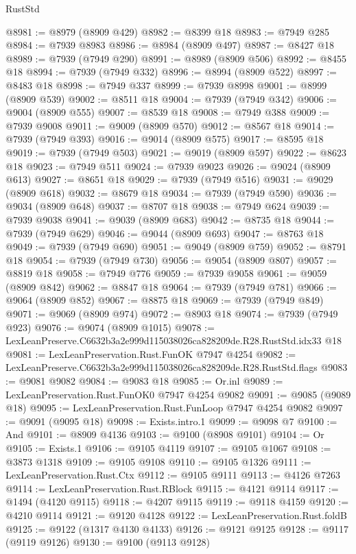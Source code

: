 \begin{lexlean}{RustStd}
\begin{coremodule}
@8981 := @8979 (@8909 @429)
@8982 := @8399 @18
@8983 := @7949 @285
@8984 := @7939 @8983
@8986 := @8984 (@8909 @497)
@8987 := @8427 @18
@8989 := @7939 (@7949 @290)
@8991 := @8989 (@8909 @506)
@8992 := @8455 @18
@8994 := @7939 (@7949 @332)
@8996 := @8994 (@8909 @522)
@8997 := @8483 @18
@8998 := @7949 @337
@8999 := @7939 @8998
@9001 := @8999 (@8909 @539)
@9002 := @8511 @18
@9004 := @7939 (@7949 @342)
@9006 := @9004 (@8909 @555)
@9007 := @8539 @18
@9008 := @7949 @388
@9009 := @7939 @9008
@9011 := @9009 (@8909 @570)
@9012 := @8567 @18
@9014 := @7939 (@7949 @393)
@9016 := @9014 (@8909 @575)
@9017 := @8595 @18
@9019 := @7939 (@7949 @503)
@9021 := @9019 (@8909 @597)
@9022 := @8623 @18
@9023 := @7949 @511
@9024 := @7939 @9023
@9026 := @9024 (@8909 @613)
@9027 := @8651 @18
@9029 := @7939 (@7949 @516)
@9031 := @9029 (@8909 @618)
@9032 := @8679 @18
@9034 := @7939 (@7949 @590)
@9036 := @9034 (@8909 @648)
@9037 := @8707 @18
@9038 := @7949 @624
@9039 := @7939 @9038
@9041 := @9039 (@8909 @683)
@9042 := @8735 @18
@9044 := @7939 (@7949 @629)
@9046 := @9044 (@8909 @693)
@9047 := @8763 @18
@9049 := @7939 (@7949 @690)
@9051 := @9049 (@8909 @759)
@9052 := @8791 @18
@9054 := @7939 (@7949 @730)
@9056 := @9054 (@8909 @807)
@9057 := @8819 @18
@9058 := @7949 @776
@9059 := @7939 @9058
@9061 := @9059 (@8909 @842)
@9062 := @8847 @18
@9064 := @7939 (@7949 @781)
@9066 := @9064 (@8909 @852)
@9067 := @8875 @18
@9069 := @7939 (@7949 @849)
@9071 := @9069 (@8909 @974)
@9072 := @8903 @18
@9074 := @7939 (@7949 @923)
@9076 := @9074 (@8909 @1015)
@9078 := LexLeanPreserve.C6632b3a2e999d115038026ca828209de.R28.RustStd.idx33 @18
@9081 := LexLeanPreservation.Rust.FunOK @7947 @4254
@9082 := LexLeanPreserve.C6632b3a2e999d115038026ca828209de.R28.RustStd.flags
@9083 := @9081 @9082
@9084 := @9083 @18
@9085 := Or.inl
@9089 := LexLeanPreservation.Rust.FunOK0 @7947 @4254 @9082
@9091 := @9085 (@9089 @18)
@9095 := LexLeanPreservation.Rust.FunLoop @7947 @4254 @9082
@9097 := @9091 (@9095 @18)
@9098 := Exists.intro.{1}
@9099 := @9098 @7
@9100 := And
@9101 := @8909 @4136
@9103 := @9100 (@8908 @9101)
@9104 := Or
@9105 := Exists.{1}
@9106 := @9105 @4119
@9107 := @9105 @1067
@9108 := @3873 @1318
@9109 := @9105 @9108
@9110 := @9105 @1326
@9111 := LexLeanPreservation.Rust.Ctx
@9112 := @9105 @9111
@9113 := @4126 @7263
@9114 := LexLeanPreservation.Rust.RBlock
@9115 := @4121 @9114
@9117 := @1494 (@4120 @9115)
@9118 := @4207 @9115
@9119 := @9118 @4159
@9120 := @4210 @9114
@9121 := @9120 @4128
@9122 := LexLeanPreservation.Rust.foldB
@9125 := @9122 (@1317 @4130 @4133)
@9126 := @9121 @9125
@9128 := @9117 (@9119 @9126)
@9130 := @9100 (@9113 @9128)

\end{coremodule}
\end{lexlean}
